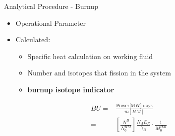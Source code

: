 \documentclass{beamer}
\begin{document}
\begin{frame}{Analytical Procedure - Burnup}
    \begin{itemize}
    \item{Operational Parameter}
    \item{Calculated:}
      \begin{itemize}
      \item{Specific heat calculation on working fluid}
      \item{Number and isotopes that fission in the system}
      \item{\textbf{burnup isotope indicator}}
      \end{itemize}
    \end{itemize}
    \begin{align*}
      BU=&\frac{\text{Power[MW]}\cdot\text{days}}{m[HM]}\\[10pt]
      =&\left[\frac{N^B}{N_0^{HM}}\right]\frac{N_AE_R}{\gamma_B}\cdot\frac{1}{M_0^{HM}}
    \end{align*}
\end{frame}
\end{document}
